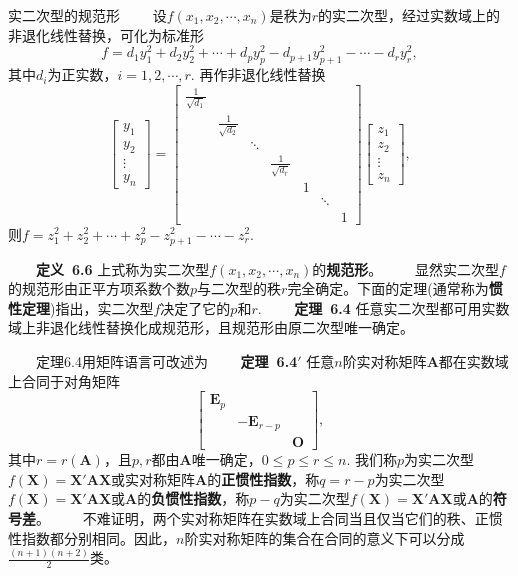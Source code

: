 \documentclass[compress,mathserif,cjk]{beamer}
\theoremstyle{remark}
\numberwithin{equation}{section}
\newcommand{\hei}{\bf}      %
\begin{document}
\begin{CJK}{UTF8}{gbsn}
\begin{frame}{实二次型的规范形}
\ \ \ \ 设$f(x_1,x_2,\cdots,x_n)$是秩为$r$的实二次型，经过实数域上的非退化线性替换，可化为标准形
$$f=d_1y_1^2+d_2y_2^2+\cdots+d_py_p^2-d_{p+1}y_{p+1}^2-\cdots-d_ry_r^2,$$
其中$d_i$为正实数，$i=1,2,\cdots,r$. 再作非退化线性替换
$$\left[\begin{matrix}y_1\\y_2\\\vdots\\y_n\end{matrix}\right]=\left[\begin{matrix}\frac{1}{\sqrt{d_1}}&&&&&&\\&\frac{1}{\sqrt{d_2}}&&&&&\\&&\ddots&&&&\\&&&\frac{1}{\sqrt{d_r}}&&&\\
&&&&1&&\\&&&&&\ddots&\\&&&&&&1\end{matrix}\right]\left[\begin{matrix}z_1\\z_2\\\vdots\\z_n\end{matrix}\right],$$
则$f=z_1^2+z_2^2+\cdots+z_p^2-z_{p+1}^2-\cdots-z_r^2$.
\end{frame}

\begin{frame}
\ \ \ \ {\hei 定义~6.6} 上式称为实二次型$f(x_1,x_2,\cdots,x_n)$的{\hei 规范形}。
\vskip 10pt
\ \ \ \ 显然实二次型$f$的规范形由正平方项系数个数$p$与二次型的秩$r$完全确定。\pause 下面的定理(通常称为{\hei 惯性定理})指出，实二次型$f$决定了它的$p$和$r$.
\vskip 10pt
\ \ \ \ {\hei 定理~6.4} 任意实二次型都可用实数域上非退化线性替换化成规范形，且规范形由原二次型唯一确定。

\end{frame}

\begin{frame}
\ \ \ \ 定理6.4用矩阵语言可改述为
\vskip 5pt
\ \ \ \ {\hei 定理~6.4$'$} 任意$n$阶实对称矩阵$\bm A$都在实数域上合同于对角矩阵
$$\left[\begin{matrix}\bm E_p&&\\&-\bm E_{r-p}&\\&&\bm O\end{matrix}\right],$$
其中$r=r(\bm A)$，且$p,r$都由$\bm A$唯一确定，$0\leq p\leq r\leq n$. 我们称$p$为实二次型$f(\bm X)=\bm X'\bm{AX}$或实对称矩阵$\bm A$的{\hei 正惯性指数}，称$q=r-p$为实二次型$f(\bm X)=\bm X'\bm{AX}$或$\bm A$的{\hei 负惯性指数}，称$p-q$为实二次型$f(\bm X)=\bm X'\bm{AX}$或$\bm A$的{\hei 符号差}。
\pause\vskip 5pt
\ \ \ \ 不难证明，两个实对称矩阵在实数域上合同当且仅当它们的秩、正惯性指数都分别相同。因此，$n$阶实对称矩阵的集合在合同的意义下可以分成$\frac{(n+1)(n+2)}2$类。
\end{frame}


\end{CJK}
\end{document}
